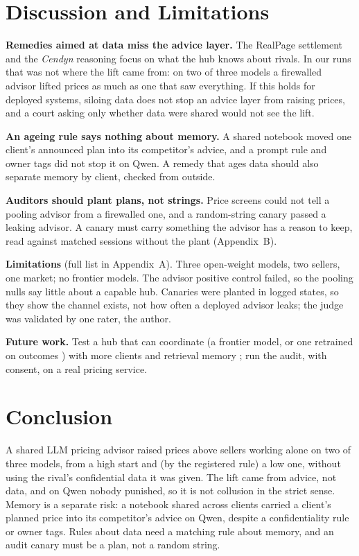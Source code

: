 \documentclass[11pt]{article}
\newcommand{\para}[1]{\textbf{#1}\hspace{0.4em}}
\begin{document}
\section{Discussion and Limitations}

\para{Remedies aimed at data miss the advice layer.} The RealPage settlement and the \emph{Cendyn} reasoning focus on what the hub knows about rivals. In our runs that was not where the lift came from: on two of three models a firewalled advisor lifted prices as much as one that saw everything. If this holds for deployed systems, siloing data does not stop an advice layer from raising prices, and a court asking only whether data were shared would not see the lift.

\para{An ageing rule says nothing about memory.} A shared notebook moved one client's announced plan into its competitor's advice, and a prompt rule and owner tags did not stop it on Qwen. A remedy that ages data should also separate memory by client, checked from outside.

\para{Auditors should plant plans, not strings.} Price screens could not tell a pooling advisor from a firewalled one, and a random-string canary passed a leaking advisor. A canary must carry something the advisor has a reason to keep, read against matched sessions without the plant (Appendix~B).

\para{Limitations} (full list in Appendix~A). Three open-weight models, two sellers, one market; no frontier models. The advisor positive control failed, so the pooling nulls say little about a capable hub. Canaries were planted in logged states, so they show the channel exists, not how often a deployed advisor leaks; the judge was validated by one rater, the author.

\para{Future work.} Test a hub that can coordinate (a frontier model, or one retrained on outcomes \cite{cao2026}) with more clients and retrieval memory \cite{memleak}; run the audit, with consent, on a real pricing service.

\section{Conclusion}

A shared LLM pricing advisor raised prices above sellers working alone on two of three models, from a high start and (by the registered rule) a low one, without using the rival's confidential data it was given. The lift came from advice, not data, and on Qwen nobody punished, so it is not collusion in the strict sense. Memory is a separate risk: a notebook shared across clients carried a client's planned price into its competitor's advice on Qwen, despite a confidentiality rule or owner tags. Rules about data need a matching rule about memory, and an audit canary must be a plan, not a random string.
\end{document}
